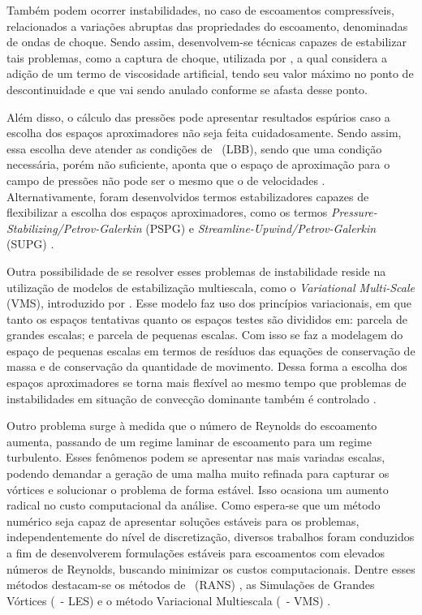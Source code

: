 Também podem ocorrer instabilidades, no caso de escoamentos compressíveis, relacionados a variações abruptas das propriedades do escoamento, denominadas de ondas de choque. Sendo assim, desenvolvem-se técnicas capazes de estabilizar tais problemas, como a captura de choque, utilizada por , a qual considera a adição de um termo de viscosidade artificial, tendo seu valor máximo no ponto de descontinuidade e que vai sendo anulado conforme se afasta desse ponto.

Além disso, o cálculo das pressões pode apresentar resultados espúrios caso a escolha dos espaços aproximadores não seja feita cuidadosamente. Sendo assim, essa escolha deve atender as condições de \LBB\ (LBB), sendo que uma condição necessária, porém não suficiente, aponta que o espaço de aproximação para o campo de pressões não pode ser o mesmo que o de velocidades \cite{BrezziF1991,donea2003finite,fernandes2020tecnica}. Alternativamente, foram desenvolvidos termos estabilizadores capazes de flexibilizar a escolha dos espaços aproximadores, como os termos \textit{Pressure-Stabilizing/Petrov-Galerkin} (PSPG) e \textit{Streamline-Upwind/Petrov-Galerkin} (SUPG) \cite{TezduyarS2003}.

Outra possibilidade de se resolver esses problemas de instabilidade reside na utilização de modelos de estabilização multiescala, como o \textit{Variational Multi-Scale} (VMS), introduzido por . Esse modelo faz uso dos princípios variacionais, em que tanto os espaços tentativas quanto os espaços testes são divididos em: parcela de grandes escalas; e parcela de pequenas escalas. Com isso se faz a modelagem do espaço de pequenas escalas em termos de resíduos das equações de conservação de massa e de conservação da quantidade de movimento. Dessa forma a escolha dos espaços aproximadores se torna mais flexível ao mesmo tempo que problemas de instabilidades em situação de convecção dominante também é controlado \cite{bazilevs2013computational,sondak2015new}.

Outro problema surge à medida que o número de Reynolds do escoamento aumenta, passando de um regime laminar de escoamento para um regime turbulento. Esses fenômenos podem se apresentar nas mais variadas escalas, podendo demandar a geração de uma malha muito refinada para capturar os vórtices e solucionar o problema de forma estável. Isso ocasiona um aumento radical no custo computacional da análise. Como espera-se que um método numérico seja capaz de apresentar soluções estáveis para os problemas, independentemente do nível de discretização, diversos trabalhos foram conduzidos a fim de desenvolverem formulações estáveis para escoamentos com elevados números de Reynolds, buscando minimizar os custos computacionais. Dentre esses métodos destacam-se os métodos de \RANS\ (RANS) \cite{speziale1991analytical,alfonsi2009reynolds,ling2015evaluation}, as Simulações de Grandes Vórtices (\LES\ - LES) \cite{germano1991dynamic,piomelli1999large,hughes2000large,vsekutkovski2021partitioned} e o método Variacional Multiescala (\VMS\ - VMS) \cite{hughes1995multiscale,hughes1998variational,hughes2002variational,bazilevs2010large,bazilevs2013computational}.

